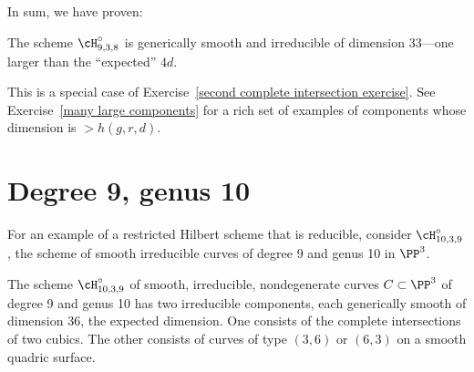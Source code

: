 In sum, we have proven:
\begin{proposition}
 The scheme $\cH^\circ_{9,3,8}$ is generically smooth and irreducible of dimension 33---one larger than the ``expected'' $4d$.
\end{proposition}
This is a special case of Exercise~\ref{second complete intersection exercise}.
See Exercise~\ref{many large components} for a rich set of examples of components whose dimension
is $>h(g,r,d)$.


\section{Degree 9, genus 10}\label{deg9 section}

For an example of a restricted Hilbert scheme that is reducible, consider $\cH^\circ_{10,3,9}$, the
scheme of smooth irreducible curves of degree 9 and genus 10 in $\PP^{3}$.

\begin{proposition}\label{types of 10,3,9}
 The scheme $\cH^\circ_{10,3,9}$ of smooth, irreducible, nondegenerate curves $C \subset \PP^3$ of degree 9 and genus 10 has two irreducible components, each generically smooth of dimension 36, the expected dimension. One consists of the complete intersections of two cubics. The other consists of curves of type $(3,6)$ or $(6,3)$ on a smooth quadric surface. \end{proposition}

